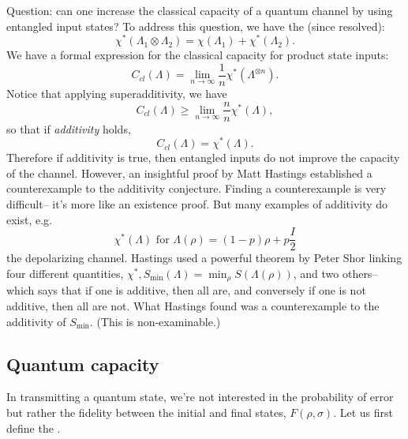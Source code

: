 Question: can one increase the classical capacity of a quantum channel by using entangled input states? To address this question, we have the  (since resolved):
\begin{equation}
    \chi^*(\Lambda_1 \otimes \Lambda_2)=\chi(\Lambda_1) +\chi^*(\Lambda_2).
\end{equation}
We have a formal expression for the classical capacity for product state inputs:
\begin{equation}
    C_{cl}(\Lambda)=\lim_{n\to \infty} \frac{1}{n} \chi^*(\Lambda^{\otimes n}).
\end{equation}
Notice that applying superadditivity, we have
\begin{equation}
    C_{cl}(\Lambda) \geq \lim_{n\to \infty}\frac{n}{n} \chi^*(\Lambda),
\end{equation}
so that if \emph{additivity} holds,
\begin{equation}
    C_{cl}(\Lambda)=\chi^*(\Lambda).
\end{equation}
Therefore if additivity is true, then entangled inputs do not improve the capacity of the channel. However, an insightful proof by Matt Hastings established a counterexample to the additivity conjecture. Finding a counterexample is very difficult-- it's more like an existence proof. But many examples of additivity do exist, e.g.
\begin{equation}
    \chi^*(\Lambda) \text{ for }\Lambda(\rho)=(1-p) \rho+p\frac{I}{2}
\end{equation}
the depolarizing channel. Hastings used a powerful theorem by Peter Shor linking four different quantities, $\chi^*, S_{\min}(\Lambda)=\min_\rho S(\Lambda(\rho))$, and two others-- which says that if one is additive, then all are, and conversely if one is not additive, then all are not. What Hastings found was a counterexample to the additivity of $S_{\min}$. (This is non-examinable.)

\subsection*{Quantum capacity}
In transmitting a quantum state, we're not interested in the probability of error but rather the fidelity between the initial and final states, $F(\rho,\sigma)$. Let us first define the . 

